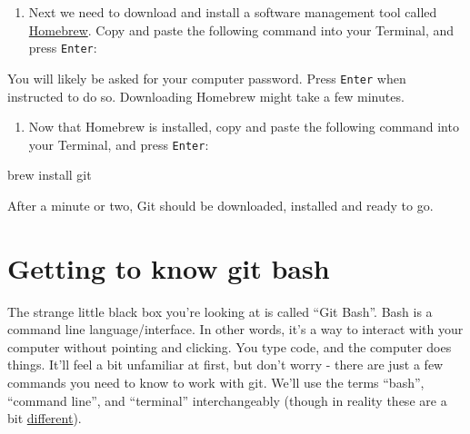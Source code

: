 \documentclass[
]{book}
\newenvironment{Shaded}{\begin{snugshade}}{\end{snugshade}}
\newcommand{\NormalTok}[1]{#1}
\newcommand{\OperatorTok}[1]{\textcolor[rgb]{0.81,0.36,0.00}{\textbf{#1}}}
\newcommand{\StringTok}[1]{\textcolor[rgb]{0.31,0.60,0.02}{#1}}
\providecommand{\tightlist}{%
  \setlength{\itemsep}{0pt}\setlength{\parskip}{0pt}}
\begin{document}
\begin{enumerate}
\def\labelenumi{\arabic{enumi}.}
\setcounter{enumi}{1}
\tightlist
\item
  Next we need to download and install a software management tool called \href{brew.sh}{Homebrew}. Copy and paste the following command into your Terminal, and press \texttt{Enter}:
\end{enumerate}

\begin{Shaded}
\end{Shaded}

You will likely be asked for your computer password. Press \texttt{Enter} when instructed to do so. Downloading Homebrew might take a few minutes.

\begin{enumerate}
\def\labelenumi{\arabic{enumi}.}
\setcounter{enumi}{2}
\tightlist
\item
  Now that Homebrew is installed, copy and paste the following command into your Terminal, and press \texttt{Enter}:
\end{enumerate}

\begin{Shaded}
\begin{Highlighting}[]
\NormalTok{brew install git}
\end{Highlighting}
\end{Shaded}

After a minute or two, Git should be downloaded, installed and ready to go.

\hypertarget{getting-to-know-git-bash}{%
\section*{Getting to know git bash}\label{getting-to-know-git-bash}}

The strange little black box you're looking at is called ``Git Bash''. Bash is a command line language/interface. In other words, it's a way to interact with your computer without pointing and clicking. You type code, and the computer does things. It'll feel a bit unfamiliar at first, but don't worry - there are just a few commands you need to know to work with git. We'll use the terms ``bash'', ``command line'', and ``terminal'' interchangeably (though in reality these are a bit \href{https://superuser.com/questions/880344/what-is-the-difference-between-terminal-and-bash}{different}).
\end{document}
